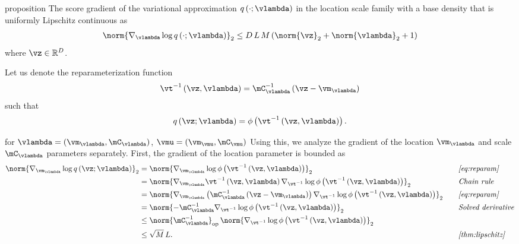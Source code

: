 
\begin{theoremEnd}{proposition}\label{thm:score_bound}
  The score gradient of the variational approximation \(q\left(\cdot; \vlambda\right)\) in the location scale family with a base density that is uniformly Lipschitz continuous as
  \begin{align*}
    \norm{ \nabla_{\vlambda} \log q\left(\cdot; \vlambda\right) }_2
    \leq
    D \, L \, M \left( \norm{\vz}_2 + \norm{\vlambda}_2 + 1 \right)
  \end{align*}
  where \(\vz \in \mathbb{R}^D\).
\end{theoremEnd}
\begin{proofEnd}
  Let us denote the reparameterization function 
  \begin{align}
    \vt^{-1}\left(\vz, \vlambda\right) = \mC^{-1}_{\vlambda}\left(\vz - \vm_{\vlambda}\right)\label{eq:reparam}
  \end{align}
  such that
  \begin{align*}
    q\left(\vz; \vlambda\right) = \phi\left( \vt^{-1}\left(\vz, \vlambda\right) \right).
  \end{align*}

  for \(\vlambda = (\vm_{\vlambda}, \mC_{\vlambda})\), \(\vmu = (\vm_{\vmu}, \mC_{\vmu})\)
  Using this, we analyze the gradient of the location \(\vm_{\vlambda}\) and scale \(\mC_{\vlambda}\) parameters separately.
  First, the gradient of the location parameter is bounded as
  \begin{alignat}{2}
    \norm{
      \nabla_{\vm_{\vlambda}} \log q\left(\vz; \vlambda\right)
    }_2
    &=
    \norm{
      \nabla_{\vm_{\vlambda}} \log \phi\left( \vt^{-1}\left(\vz, \vlambda\right) \right)
    }_2
    &&\quad\text{\textit{\cref{eq:reparam}}}
    \nonumber
    \\
    &=
    \norm{
    \nabla_{\vm_{\vlambda}} \vt^{-1}\left(\vz, \vlambda\right)  \nabla_{\vt^{-1}} \log \phi\left( \vt^{-1}\left(\vz, \vlambda\right) \right) 
    }_2
    &&\quad\text{\textit{Chain rule}}
    \nonumber
    \\
    &=
    \norm{
    \nabla_{\vm_{\vlambda}} \left( \mC^{-1}_{\vlambda}\left(\vz - \vm_{\vlambda}\right) \right) \nabla_{\vt^{-1}} \log \phi\left( \vt^{-1}\left(\vz, \vlambda\right) \right) 
    }_2
    &&\quad\text{\textit{\cref{eq:reparam}}}
    \nonumber
    \\
    &=
    \norm{
      -\mC^{-1}_{\vlambda}
      \nabla_{\vt^{-1}} \log \phi\left( \vt^{-1}\left(\vz, \vlambda\right) \right) 
    }_2
    &&\quad\text{\textit{Solved derivative}}
    \nonumber
    \\
    &\leq
    \norm{
      \mC^{-1}_{\vlambda}
    }_{\mathrm{op}}
    \,
    \norm{
      \nabla_{\vt^{-1}} \log \phi\left( \vt^{-1}\left(\vz, \vlambda\right) \right) 
    }_2
    \nonumber
    \\
    &\leq
    \sqrt{M} \,
    L.
    &&\quad\text{\textit{\cref{thm:lipschitz}}}
    \label{eq:location_grad}
  \end{alignat}


\end{proofEnd}
